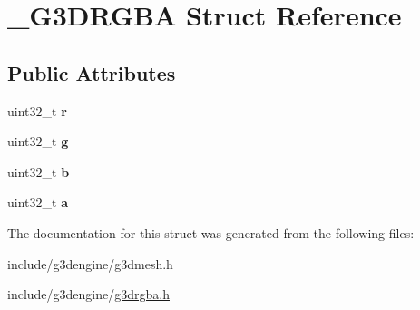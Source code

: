 \hypertarget{struct__G3DRGBA}{}\section{\+\_\+\+G3\+D\+R\+G\+BA Struct Reference}
\label{struct__G3DRGBA}
\subsection*{Public Attributes}
\begin{DoxyCompactItemize}
\item 
\mbox{\label{struct__G3DRGBA_a0ed2188e1394cd4d06d6898b5c266d02}} 
uint32\+\_\+t {\bfseries r}
\item 
\mbox{\label{struct__G3DRGBA_a67c418883e19709c121f3fe6d6c9c996}} 
uint32\+\_\+t {\bfseries g}
\item 
\mbox{\label{struct__G3DRGBA_a2d5445c71c1db663ca05fe4af523c754}} 
uint32\+\_\+t {\bfseries b}
\item 
\mbox{\label{struct__G3DRGBA_a3daeffab74ba147e7f10f75cc5d82f1d}} 
uint32\+\_\+t {\bfseries a}
\end{DoxyCompactItemize}


The documentation for this struct was generated from the following files\+:\begin{DoxyCompactItemize}
\item 
include/g3dengine/g3dmesh.\+h\item 
include/g3dengine/\hyperlink{g3drgba_8h}{g3drgba.\+h}\end{DoxyCompactItemize}
